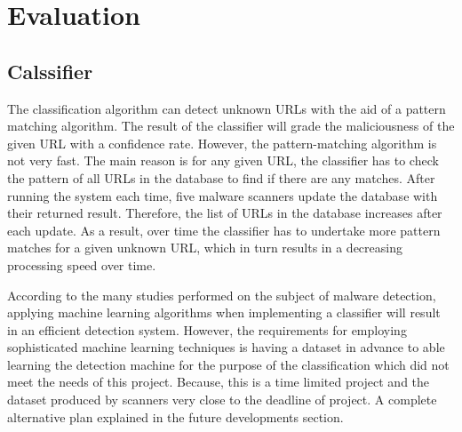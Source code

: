 \section{Evaluation}

\subsection{Calssifier}

The classification algorithm can detect unknown URLs with the aid of a pattern matching algorithm. The result of the classifier will grade the maliciousness of the given URL with a confidence rate. However, the pattern-matching algorithm is not very fast. The main reason is for any given URL, the classifier has to check the pattern of all URLs in the database to find if there are any matches. After running the system each time, five malware scanners update the database with their returned result. Therefore, the list of URLs in the database increases after each update. As a result, over time the classifier has to undertake more pattern matches for a given unknown URL, which in turn results in a decreasing processing speed over time.

According to the many studies performed on the subject of malware detection, applying machine learning algorithms when implementing a classifier will result in an efficient detection system. However, the requirements for employing sophisticated machine learning techniques is having a dataset in advance to able learning the detection machine for the purpose of the classification which did not meet the needs of this project. Because, this is a time limited project and the dataset produced by scanners very close to the deadline of project. A complete alternative plan explained in the future developments section. 